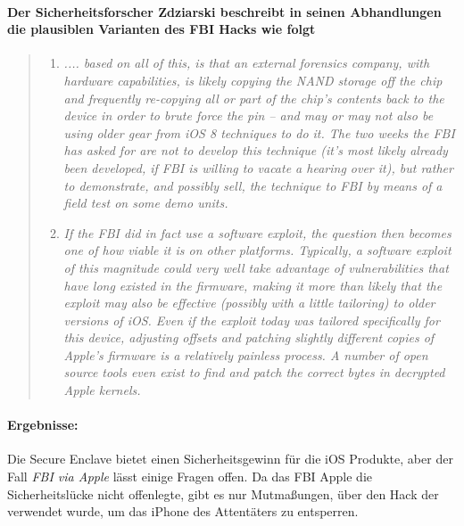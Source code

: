 \paragraph{Der Sicherheitsforscher Zdziarski beschreibt in seinen Abhandlungen die plausiblen Varianten des FBI Hacks wie folgt}
\begin{quote}
\begin{enumerate}
    \item \textit{\glqq .... based on all of this, is that an external forensics company, with hardware capabilities, is likely copying the NAND storage off the chip and frequently re-copying all or part of the chip’s contents back to the device in order to brute force the pin – and may or may not also be using older gear from iOS 8 techniques to do it. The two weeks the FBI has asked for are not to develop this technique (it’s most likely already been developed, if FBI is willing to vacate a hearing over it), but rather to demonstrate, and possibly sell, the technique to FBI by means of a field test on some demo units.\grqq{}} \cite{Hacking[6]} 
    \item \textit{\glqq If the FBI did in fact use a software exploit, the question then becomes one of how viable it is on other platforms. Typically, a software exploit of this magnitude could very well take advantage of vulnerabilities that have long existed in the firmware, making it more than likely that the exploit may also be effective (possibly with a little tailoring) to older versions of iOS. Even if the exploit today was tailored specifically for this device, adjusting offsets and patching slightly different copies of Apple’s firmware is a relatively painless process. A number of open source tools even exist to find and patch the correct bytes in decrypted Apple kernels.\grqq{}} \cite{Hacking[7]}
\end{enumerate}
  
\end{quote}
\paragraph{Ergebnisse:} Die Secure Enclave bietet einen Sicherheitsgewinn für die iOS Produkte, aber der Fall \textit{\glqq FBI via Apple\grqq{}} lässt einige Fragen offen. Da das FBI Apple die Sicherheitslücke nicht offenlegte, gibt es nur Mutmaßungen, über den Hack der verwendet wurde, um das iPhone des Attentäters zu entsperren. \par 

